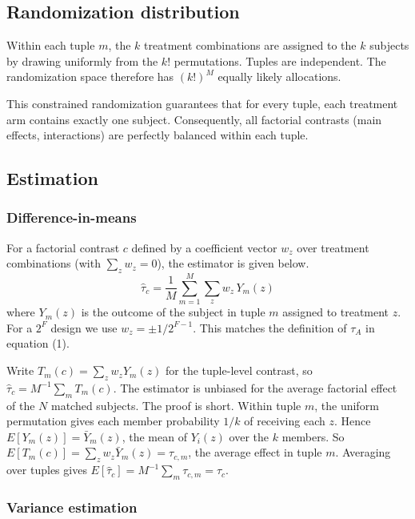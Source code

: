 \documentclass[
  11pt,
]{article}
\begin{document}
\subsection{Randomization distribution}\label{randomization-distribution}

Within each tuple \(m\), the \(k\) treatment combinations are
assigned to the \(k\) subjects by drawing uniformly from the
\(k!\) permutations. Tuples are independent. The randomization
space therefore has \((k!)^M\) equally likely allocations.

This constrained randomization guarantees that for every
tuple, each treatment arm contains exactly one subject.
Consequently, all factorial contrasts (main effects,
interactions) are perfectly balanced within each tuple.

\subsection{Estimation}\label{estimation}

\subsubsection{Difference-in-means}\label{difference-in-means}

For a factorial contrast \(c\) defined by a coefficient vector
\(w_z\) over treatment combinations (with \(\sum_z w_z = 0\)),
the estimator is given below.
\begin{equation}
  \hat{\tau}_c = \frac{1}{M} \sum_{m=1}^{M}
    \sum_{z} w_z \, Y_{m}(z)
\end{equation}
where \(Y_{m}(z)\) is the outcome of the subject in tuple \(m\)
assigned to treatment \(z\). For a \(2^F\) design we use
\(w_z = \pm 1/2^{F-1}\). This matches the definition of
\(\tau_A\) in equation (1).

Write \(T_m(c) = \sum_z w_z Y_m(z)\) for the tuple-level
contrast, so \(\hat\tau_c = M^{-1} \sum_m T_m(c)\). The
estimator is unbiased for the average factorial effect of
the \(N\) matched subjects. The proof is short. Within tuple
\(m\), the uniform permutation gives each member probability
\(1/k\) of receiving each \(z\). Hence \(E[Y_m(z)] =
\bar{Y}_m(z)\), the mean of \(Y_i(z)\) over the \(k\) members.
So \(E[T_m(c)] = \sum_z w_z \bar{Y}_m(z) = \tau_{c,m}\), the
average effect in tuple \(m\). Averaging over tuples gives
\(E[\hat\tau_c] = M^{-1}\sum_m \tau_{c,m} = \tau_c\).

\subsubsection{Variance estimation}\label{variance-estimation}
\end{document}
